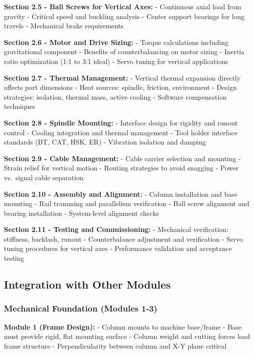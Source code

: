\documentclass[
]{article}
\begin{document}
\textbf{Section 2.5 - Ball Screws for Vertical Axes:} - Continuous axial
load from gravity - Critical speed and buckling analysis - Center
support bearings for long travels - Mechanical brake requirements

\textbf{Section 2.6 - Motor and Drive Sizing:} - Torque calculations
including gravitational component - Benefits of counterbalancing on
motor sizing - Inertia ratio optimization (1:1 to 3:1 ideal) - Servo
tuning for vertical applications

\textbf{Section 2.7 - Thermal Management:} - Vertical thermal expansion
directly affects part dimensions - Heat sources: spindle, friction,
environment - Design strategies: isolation, thermal mass, active cooling
- Software compensation techniques

\textbf{Section 2.8 - Spindle Mounting:} - Interface design for rigidity
and runout control - Cooling integration and thermal management - Tool
holder interface standards (BT, CAT, HSK, ER) - Vibration isolation and
damping

\textbf{Section 2.9 - Cable Management:} - Cable carrier selection and
mounting - Strain relief for vertical motion - Routing strategies to
avoid snagging - Power vs.~signal cable separation

\textbf{Section 2.10 - Assembly and Alignment:} - Column installation
and base mounting - Rail tramming and parallelism verification - Ball
screw alignment and bearing installation - System-level alignment checks

\textbf{Section 2.11 - Testing and Commissioning:} - Mechanical
verification: stiffness, backlash, runout - Counterbalance adjustment
and verification - Servo tuning procedures for vertical axes -
Performance validation and acceptance testing

\subsection{Integration with Other
Modules}\label{integration-with-other-modules}

\subsubsection{Mechanical Foundation (Modules
1-3)}\label{mechanical-foundation-modules-1-3}

\textbf{Module 1 (Frame Design):} - Column mounts to machine base/frame
- Base must provide rigid, flat mounting surface - Column weight and
cutting forces load frame structure - Perpendicularity between column
and X-Y plane critical
\end{document}
